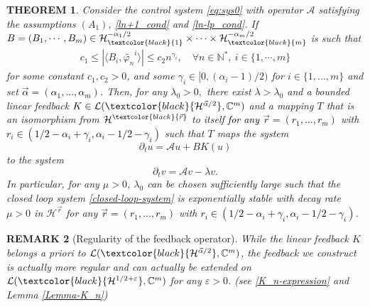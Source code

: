 \documentclass[11pt, dvipsnames]{amsart}
\newtheorem{theorem}{THEOREM}[section]
\newtheorem{rmk}[theorem]{REMARK}
\begin{document}
\begin{theorem}\label{Theo_main}
Consider the control system \eqref{eq:sys0} with operator $\mathcal{A}$ satisfying the assumptions $(A_{1})$, \eqref{ln+1_cond} and \eqref{ln-lp_cond}. If $B=(B_1,\cdots,B_m)\in\mathcal{H}_{\textcolor{black}{1}}^{-\alpha_1/2}\times \cdots\times \mathcal{H}_{\textcolor{black}{m}}^{-\alpha_m/2}$ is such that 
\begin{align}
  c_1\leq |\langle B_i,\widetilde{\varphi_n}^i\rangle|\leq c_2 n^{\gamma_{i}}, \quad \forall n\in \mathbb{N}^*,\ i\in\{1,\cdots,m\} \label{control_cond} 
\end{align} 
for some constant $c_1,c_2>0$, and some $\gamma_{i}\in [0,(\alpha_{i}-1)/2)$ for $i\in\{1,...,m\}$
and set \textcolor{black}{$\vec{\alpha}=(\alpha_{1},...,\alpha_{m})$.} 
Then, 
for any $\lambda_{0}>0,$ 
there exist $\lambda>\lambda_{0}$ and a bounded linear feedback $K\in \mathcal{L}(\textcolor{black}{\mathcal{H}^{\vec{\alpha}/2}},\mathbb{C}^m)$ and a mapping $T
$ that is an isomorphism from $\mathcal{H}^{\textcolor{black}{\vec r}}$ to itself \textcolor{black}{for any $\vec r=(r_{1},..., r_{m})$} with \textcolor{black}{$r_{i}\in(1/2-\alpha_{i}+\gamma_{i},\alpha_{i}-1/2-\gamma_{i})$} such that $T$ maps the system
\begin{equation}
    \partial_t u=\mathcal{A}u+BK(u)\label{closed-loop-system}
\end{equation} to the system
\begin{equation}
    \partial_t v=\mathcal{A}v-\lambda v.\label{target-system}
\end{equation}
In particular, for any $\mu>0$, $\lambda_{0}$ can be chosen sufficiently large such that the closed loop system \eqref{closed-loop-system} is exponentially stable with decay rate $\mu>0$ in $\mathcal{H}^{\vec r}$ for any 
\textcolor{black}{$\vec r=(r_{1},..., r_{m})$} with \textcolor{black}{$r_{i}\in(1/2-\alpha_{i}+\gamma_{i},\alpha_{i}-1/2-\gamma_{i})$}.
\end{theorem}




\begin{rmk}[Regularity of the feedback operator]
While the linear feedback $K$ belongs \emph{a priori} to $\mathcal{L}(\textcolor{black}{\mathcal{H}^{\vec{\alpha}/2}},\mathbb{C}^m)$, the feedback we construct is actually more regular and can actually be extended on $\mathcal{L}(\textcolor{black}{\mathcal{H}^{1/2+\varepsilon}},\mathbb{C}^{m})$ for any $\varepsilon>0$. (see \eqref{K_n-expression} and Lemma \ref{Lemma-K_n})
\end{rmk}
\end{document}
